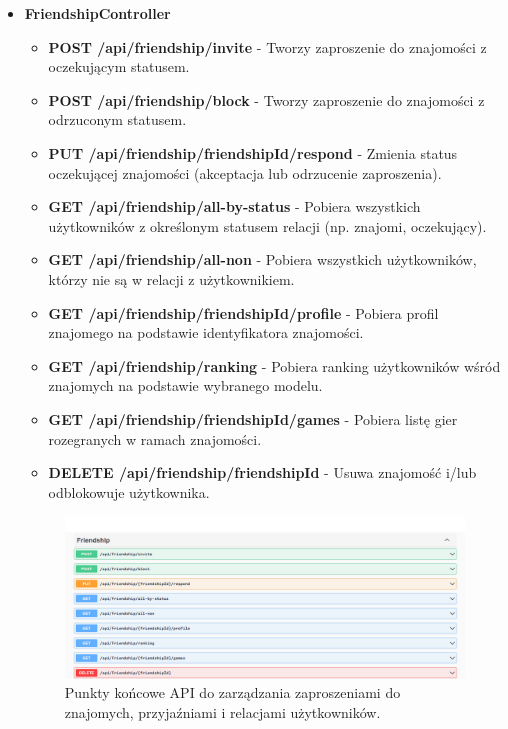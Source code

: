 \documentclass[12pt,a4paper]{article}
\begin{document}
\begin{itemize}
    \item \textbf{FriendshipController}
    \begin{itemize} 
        \item \textbf{POST /api/friendship/invite} - Tworzy zaproszenie do znajomości z oczekującym statusem. 
        \item \textbf{POST /api/friendship/block} - Tworzy zaproszenie do znajomości z odrzuconym statusem. 
        \item \textbf{PUT /api/friendship/{friendshipId}/respond} - Zmienia status oczekującej znajomości (akceptacja lub odrzucenie zaproszenia). 
        \item \textbf{GET /api/friendship/all-by-status} - Pobiera wszystkich użytkowników z określonym statusem relacji (np. znajomi, oczekujący). 
        \item \textbf{GET /api/friendship/all-non} - Pobiera wszystkich użytkowników, którzy nie są w relacji z użytkownikiem. 
        \item \textbf{GET /api/friendship/{friendshipId}/profile} - Pobiera profil znajomego na podstawie identyfikatora znajomości. 
        \item \textbf{GET /api/friendship/ranking} - Pobiera ranking użytkowników wśród znajomych na podstawie wybranego modelu. 
        \item \textbf{GET /api/friendship/{friendshipId}/games} - Pobiera listę gier rozegranych w ramach znajomości. 
        \item \textbf{DELETE /api/friendship/{friendshipId}} - Usuwa znajomość i/lub odblokowuje użytkownika. 
    \end{itemize}
    \begin{figure}[h!]
        \centering
        \includegraphics[width=1\textwidth]{zdj/friendship_controller.png}
        \caption{Punkty końcowe API do zarządzania zaproszeniami do znajomych, przyjaźniami i relacjami użytkowników.}
    \end{figure}


\end{itemize}
\end{document}
